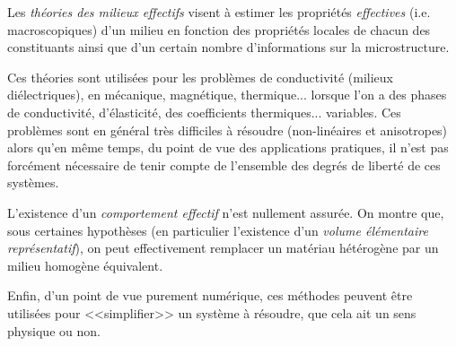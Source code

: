 \medskip
\begin{histoire}%
Les \emph{théories des milieux effectifs} visent à estimer les propriétés \emph{effectives} (i.e. macroscopiques) d'un 
milieu en fonction des propriétés locales de chacun des constituants ainsi
que d'un certain nombre d'informations sur la microstructure.

\medskip
{}

\medskip
Ces théories sont utilisées pour les problèmes de conductivité (milieux diélectriques), 
en mécanique, magnétique, thermique... lorsque l'on a des phases de conductivité, 
d'élasticité, des coefficients thermiques... variables. 
Ces problèmes sont en général très difficiles à résoudre (non-linéaires et anisotropes)
alors qu'en même temps, du point de vue des applications pratiques, il n'est pas forcément 
nécessaire de tenir compte de l'ensemble des degrés de liberté de ces systèmes. 

\medskip
L'existence d'un \emph{comportement effectif} n'est nullement assurée. 
On montre que, sous certaines hypothèses (en particulier l'existence d'un \emph{volume 
élémentaire représentatif}), on peut effectivement 
remplacer un matériau hétérogène par un milieu homogène équivalent.

Enfin, d'un point de vue purement numérique, ces méthodes peuvent être
utilisées pour <<simplifier>> un système à résoudre, que cela ait un sens
physique ou non.
\end{histoire}

